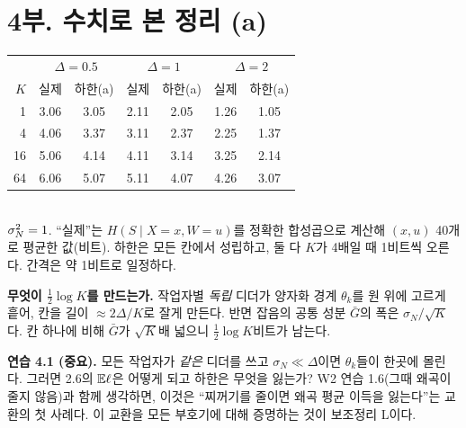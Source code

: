 \section*{4부. 수치로 본 정리 (a)}
\begin{center}\small
\renewcommand{\arraystretch}{1.25}
\begin{tabular}{rcccccc}
\toprule
 & \multicolumn{2}{c}{$\Delta=0.5$} & \multicolumn{2}{c}{$\Delta=1$} & \multicolumn{2}{c}{$\Delta=2$}\\
$K$ & 실제 & 하한(a) & 실제 & 하한(a) & 실제 & 하한(a)\\ \midrule
1 & 3.06 & 3.05 & 2.11 & 2.05 & 1.26 & 1.05\\
4 & 4.06 & 3.37 & 3.11 & 2.37 & 2.25 & 1.37\\
16 & 5.06 & 4.14 & 4.11 & 3.14 & 3.25 & 2.14\\
64 & 6.06 & 5.07 & 5.11 & 4.07 & 4.26 & 3.07\\
\bottomrule
\end{tabular}\\[2pt]
$\sigma_N^2=1$. “실제”는 $H(S\mid X=x,W=u)$를 정확한 합성곱으로 계산해 $(x,u)$ 40개로 평균한 값(비트). 하한은 모든 칸에서 성립하고, 둘 다 $K$가 4배일 때 1비트씩 오른다. 간격은 약 1비트로 일정하다.
\end{center}

\begin{bridge}
\textbf{무엇이 $\frac12\log K$를 만드는가.} 작업자별 \emph{독립} 디더가 양자화 경계 $\theta_k$를 원 위에 고르게 흩어, 칸을 길이 $\approx2\Delta/K$로 잘게 만든다. 반면 잡음의 공통 성분 $\bar G$의 폭은 $\sigma_N/\sqrt K$다. 칸 하나에 비해 $\bar G$가 $\sqrt K$배 넓으니 $\frac12\log K$비트가 남는다.

\textbf{연습 4.1 (중요).} 모든 작업자가 \emph{같은} 디더를 쓰고 $\sigma_N\ll\Delta$이면 $\theta_k$들이 한곳에 몰린다. 그러면 2.6의 $\mathbb{E}\ell$은 어떻게 되고 하한은 무엇을 잃는가? W2 연습 1.6(그때 왜곡이 줄지 않음)과 함께 생각하면, 이것은 “찌꺼기를 줄이면 왜곡 평균 이득을 잃는다”는 교환의 첫 사례다. 이 교환을 모든 부호기에 대해 증명하는 것이 보조정리 L이다.
\vspace{3em}
\end{bridge}

\newpage
